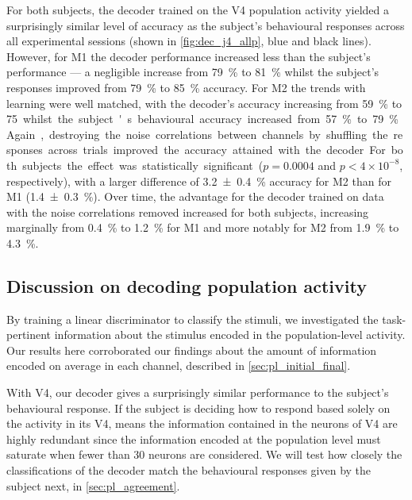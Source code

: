 For both subjects, the decoder trained on the \ac{V4} population activity yielded a surprisingly similar level of accuracy as the subject's behavioural responses across all experimental sessions (shown in \autoref{fig:dec_j4_allp}, blue and black lines).
However, for \ac{M1} the decoder performance increased less than the subject's performance --- a negligible increase from \SI{79}{\percent} to \SI{81}{\percent} whilst the subject's responses improved from \SI{79}{\percent} to \SI{85}{\percent} accuracy.
For \ac{M2} the trends with learning were well matched, with the decoder's accuracy increasing from \SI{59}{\percent} to \SI{75} whilst the subject's behavioural accuracy increased from \SI{57}{\percent} to \SI{79}{\percent}.

Again, destroying the noise correlations between channels by shuffling the responses across trials improved the accuracy attained with the decoder.
For both subjects the effect was statistically significant ($p=0.0004$ and $p < 4 \times 10^{-8}$, respectively), with a larger difference of \SI{+3.2\pm0.4}{\percent} accuracy for \ac{M2} than for \ac{M1} (\SI{+1.4\pm0.3}{\percent}).
Over time, the advantage for the decoder trained on data with the noise correlations removed increased for both subjects, increasing marginally from \SI{0.4}{\percent} to \SI{1.2}{\percent} for \ac{M1} and more notably for \ac{M2} from \SI{1.9}{\percent} to \SI{4.3}{\percent}.


\subsection{Discussion on decoding population activity}

By training a linear discriminator to classify the stimuli, we investigated the task-pertinent information about the stimulus encoded in the population-level activity.
Our results here corroborated our findings about the amount of information encoded on average in each channel, described in \autoref{sec:pl_initial_final}.

With \ac{V4}, our decoder gives a surprisingly similar performance to the subject's behavioural response.
If the subject is deciding how to respond based solely on the activity in its \ac{V4}, means the information contained in the neurons of \ac{V4} are highly redundant since the information encoded at the population level must saturate when fewer than \num{30} neurons are considered.
We will test how closely the classifications of the decoder match the behavioural responses given by the subject next, in \autoref{sec:pl_agreement}.

